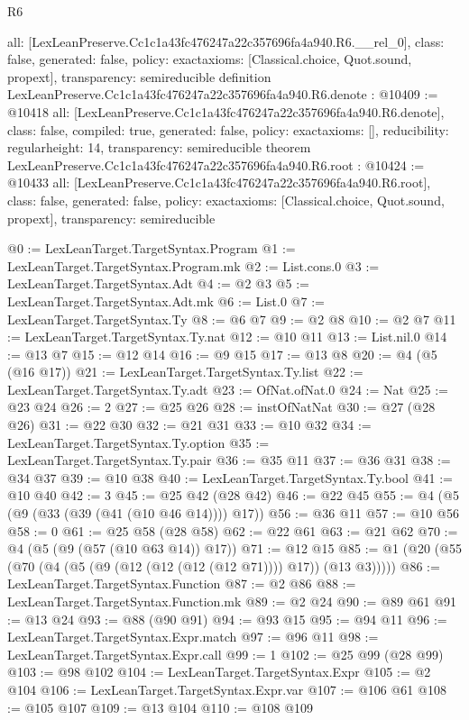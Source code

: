 \begin{lexlean}{R6}
\begin{coremodule}
{  all: [LexLeanPreserve.Cc1c1a43fc476247a22c357696fa4a940.R6.__rel_0],
  class: false,
  generated: false,
  policy: exact{axioms: [Classical.choice, Quot.sound, propext]},
  transparency: semireducible
}
definition LexLeanPreserve.Cc1c1a43fc476247a22c357696fa4a940.R6.denote : @10409 := @10418 {
  all: [LexLeanPreserve.Cc1c1a43fc476247a22c357696fa4a940.R6.denote],
  class: false,
  compiled: true,
  generated: false,
  policy: exact{axioms: []},
  reducibility: regular{height: 14},
  transparency: semireducible
}
theorem LexLeanPreserve.Cc1c1a43fc476247a22c357696fa4a940.R6.root : @10424 := @10433 {
  all: [LexLeanPreserve.Cc1c1a43fc476247a22c357696fa4a940.R6.root],
  class: false,
  generated: false,
  policy: exact{axioms: [Classical.choice, Quot.sound, propext]},
  transparency: semireducible
}

@0 := LexLeanTarget.TargetSyntax.Program
@1 := LexLeanTarget.TargetSyntax.Program.mk
@2 := List.cons.{0}
@3 := LexLeanTarget.TargetSyntax.Adt
@4 := @2 @3
@5 := LexLeanTarget.TargetSyntax.Adt.mk
@6 := List.{0}
@7 := LexLeanTarget.TargetSyntax.Ty
@8 := @6 @7
@9 := @2 @8
@10 := @2 @7
@11 := LexLeanTarget.TargetSyntax.Ty.nat
@12 := @10 @11
@13 := List.nil.{0}
@14 := @13 @7
@15 := @12 @14
@16 := @9 @15
@17 := @13 @8
@20 := @4 (@5 (@16 @17))
@21 := LexLeanTarget.TargetSyntax.Ty.list
@22 := LexLeanTarget.TargetSyntax.Ty.adt
@23 := OfNat.ofNat.{0}
@24 := Nat
@25 := @23 @24
@26 := 2
@27 := @25 @26
@28 := instOfNatNat
@30 := @27 (@28 @26)
@31 := @22 @30
@32 := @21 @31
@33 := @10 @32
@34 := LexLeanTarget.TargetSyntax.Ty.option
@35 := LexLeanTarget.TargetSyntax.Ty.pair
@36 := @35 @11
@37 := @36 @31
@38 := @34 @37
@39 := @10 @38
@40 := LexLeanTarget.TargetSyntax.Ty.bool
@41 := @10 @40
@42 := 3
@45 := @25 @42 (@28 @42)
@46 := @22 @45
@55 := @4 (@5 (@9 (@33 (@39 (@41 (@10 @46 @14)))) @17))
@56 := @36 @11
@57 := @10 @56
@58 := 0
@61 := @25 @58 (@28 @58)
@62 := @22 @61
@63 := @21 @62
@70 := @4 (@5 (@9 (@57 (@10 @63 @14)) @17))
@71 := @12 @15
@85 := @1 (@20 (@55 (@70 (@4 (@5 (@9 (@12 (@12 (@12 (@12 @71)))) @17)) (@13 @3)))))
@86 := LexLeanTarget.TargetSyntax.Function
@87 := @2 @86
@88 := LexLeanTarget.TargetSyntax.Function.mk
@89 := @2 @24
@90 := @89 @61
@91 := @13 @24
@93 := @88 (@90 @91)
@94 := @93 @15
@95 := @94 @11
@96 := LexLeanTarget.TargetSyntax.Expr.match
@97 := @96 @11
@98 := LexLeanTarget.TargetSyntax.Expr.call
@99 := 1
@102 := @25 @99 (@28 @99)
@103 := @98 @102
@104 := LexLeanTarget.TargetSyntax.Expr
@105 := @2 @104
@106 := LexLeanTarget.TargetSyntax.Expr.var
@107 := @106 @61
@108 := @105 @107
@109 := @13 @104
@110 := @108 @109

\end{coremodule}
\end{lexlean}
